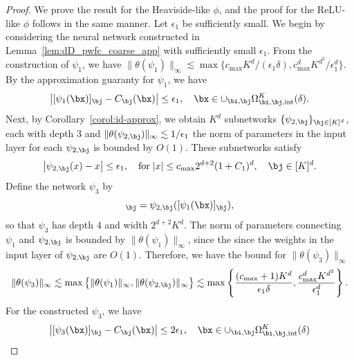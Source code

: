 \documentclass[11pt]{article}
\begin{document}
\begin{proof}
     We prove the result for the Heaviside-like $\phi$, and the proof for the ReLU-like $\phi$ follows in the same manner. Let $\epsilon_1$ be sufficiently small. We begin by considering the neural network constructed in Lemma~\ref{lem:dD_pwfc_coarse_app} with sufficiently small $\epsilon_1$. From the construction of $\psi_1$, we have  $\|\theta(\psi_1)\|_{\infty}\lesssim \max \{c_{\max} K^{d}/(\epsilon_1 \delta), c_{\max}^d K^{d^2} / \epsilon_1^d\}$. By the approximation guaranty for $\psi_1$, we have 
    \begin{equation*}
        \left| [\psi_1(\bx)]_{\bj} - C_{\bj}(\bx)\right| \leq \epsilon_1, \quad \bx \in \cup_{\bi, \bj} \Omega_{\bi, \bj, \mathrm{int}}^{K}(\delta).
    \end{equation*}
    Next, by Corollary~\ref{corol:id-approx}, we obtain $K^d$ subnetworks $\{\psi_{2,\bj}\}_{\bj \in [K]^d}$, each with depth 3 and $\|\theta(\psi_{2,\bj})\|_{\infty}\lesssim 1 / \epsilon_1$ the norm of  parameters in the input layer for each $\psi_{2,\bj}$ is bounded by $O(1)$. These subnetworks satisfy
    \begin{equation*}
        \left| \psi_{2, \bj}(x) - x\right| \leq \epsilon_1, \quad \mathrm{for} \; |x| \leq c_{\max} 2^{d+2}(1+C_1)^d, \quad  \bj \in [K]^d.
    \end{equation*}
    Define the network $\psi_{3}$ by 
    \begin{equation*}
        [\psi_3(\bx)]_{\bj} = \psi_{2, \bj}( [\psi_1(\bx)]_{\bj}),
    \end{equation*}
    so that $\psi_{3}$ has depth $4$ and width $2^{d+2}K^{d}$. The norm of parameters connecting $\psi_1$ and $\psi_{2, \bj}$ is bounded by $\|\theta(\psi_1)\|_{\infty}$, since the since the weights in the input layer of $\psi_{2,\bj}$ are $O(1)$. Therefore, we have the bound for $\|\theta(\psi_3)\|_{\infty}$ 
    \begin{equation*}
        \|\theta(\psi_3)\|_{\infty} \lesssim \max \left\{  \|\theta(\psi_1)\|_{\infty} , \|\theta(\psi_{2,\bj})\|_{\infty} \right\} \lesssim  \max\left\{ \frac{(c_{\max}+1) K^d}{\epsilon_1 \delta}, \frac{c_{\max}^d K^{d^2}}{\epsilon_1^d}\right\}.
    \end{equation*}
    For the constructed $\psi_3$, we have 
    \begin{equation*}
        \left| [\psi_3(\bx)]_{\bj} - C_{\bj}(\bx)\right| \leq 2 \epsilon_1, \quad \bx \in \cup_{\bi,\bj}\Omega_{\bi, \bj,\mathrm{int}}^{K}(\delta)
    \end{equation*}

\end{proof}
\end{document}
